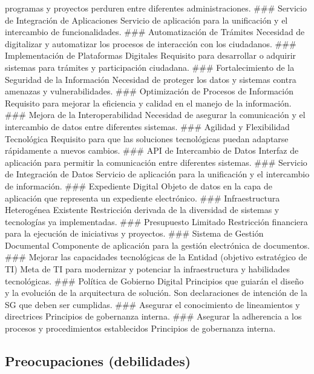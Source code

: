\documentclass[
	a4paper, %
	12pt, %
]{include/CSSullivanBusinessReport}
\begin{document}
\begin{itemize}
  programas y proyectos perduren entre diferentes administraciones.
  \#\#\# Servicio de Integración de Aplicaciones Servicio de aplicación
  para la unificación y el intercambio de funcionalidades. \#\#\#
  Automatización de Trámites Necesidad de digitalizar y automatizar los
  procesos de interacción con los ciudadanos. \#\#\# Implementación de
  Plataformas Digitales Requisito para desarrollar o adquirir sistemas
  para trámites y participación ciudadana. \#\#\# Fortalecimiento de la
  Seguridad de la Información Necesidad de proteger los datos y sistemas
  contra amenazas y vulnerabilidades. \#\#\# Optimización de Procesos de
  Información Requisito para mejorar la eficiencia y calidad en el
  manejo de la información. \#\#\# Mejora de la Interoperabilidad
  Necesidad de asegurar la comunicación y el intercambio de datos entre
  diferentes sistemas. \#\#\# Agilidad y Flexibilidad Tecnológica
  Requisito para que las soluciones tecnológicas puedan adaptarse
  rápidamente a nuevos cambios. \#\#\# API de Intercambio de Datos
  Interfaz de aplicación para permitir la comunicación entre diferentes
  sistemas. \#\#\# Servicio de Integración de Datos Servicio de
  aplicación para la unificación y el intercambio de información. \#\#\#
  Expediente Digital Objeto de datos en la capa de aplicación que
  representa un expediente electrónico. \#\#\# Infraestructura
  Heterogénea Existente Restricción derivada de la diversidad de
  sistemas y tecnologías ya implementadas. \#\#\# Presupuesto Limitado
  Restricción financiera para la ejecución de iniciativas y proyectos.
  \#\#\# Sistema de Gestión Documental Componente de aplicación para la
  gestión electrónica de documentos. \#\#\# Mejorar las capacidades
  tecnológicas de la Entidad (objetivo estratégico de TI) Meta de TI
  para modernizar y potenciar la infraestructura y habilidades
  tecnológicas. \#\#\# Política de Gobierno Digital Principios que
  guiarán el diseño y la evolución de la arquitectura de solución. Son
  declaraciones de intención de la SG que deben ser cumplidas. \#\#\#
  Asegurar el conocimiento de lineamientos y directrices Principios de
  gobernanza interna. \#\#\# Asegurar la adherencia a los procesos y
  procedimientos establecidos Principios de gobernanza interna.
\end{itemize}

\subsection{Preocupaciones
(debilidades)}\label{sec:preocupaciones-debilidades}
\end{document}
